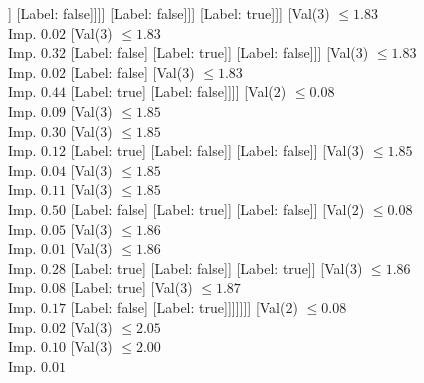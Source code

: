 \documentclass[margin=10pt]{standalone}
\begin{document}
\begin{forest}
														[Val($3$) $ \leq 1.80$ \\ Imp. $0.11$
															[Label: false]
															[Val($3$) $ \leq 1.82$ \\ Imp. $0.22$
																[Label: true]
																[Val($3$) $ \leq 1.83$ \\ Imp. $0.11$
																	[Val($3$) $ \leq 1.82$ \\ Imp. $0.50$
																		[Label: false]
																		[Label: true]]
																	[Label: false]]]]
														[Label: false]]]
												[Label: true]]]
										[Val($3$) $ \leq 1.83$ \\ Imp. $0.02$
											[Val($3$) $ \leq 1.83$ \\ Imp. $0.32$
												[Label: false]
												[Label: true]]
											[Label: false]]]
									[Val($3$) $ \leq 1.83$ \\ Imp. $0.02$
										[Label: false]
										[Val($3$) $ \leq 1.83$ \\ Imp. $0.44$
											[Label: true]
											[Label: false]]]]
								[Val($2$) $ \leq 0.08$ \\ Imp. $0.09$
									[Val($3$) $ \leq 1.85$ \\ Imp. $0.30$
										[Val($3$) $ \leq 1.85$ \\ Imp. $0.12$
											[Label: true]
											[Label: false]]
										[Label: false]]
									[Val($3$) $ \leq 1.85$ \\ Imp. $0.04$
										[Val($3$) $ \leq 1.85$ \\ Imp. $0.11$
											[Val($3$) $ \leq 1.85$ \\ Imp. $0.50$
												[Label: false]
												[Label: true]]
											[Label: false]]
										[Val($2$) $ \leq 0.08$ \\ Imp. $0.05$
											[Val($3$) $ \leq 1.86$ \\ Imp. $0.01$
												[Val($3$) $ \leq 1.86$ \\ Imp. $0.28$
													[Label: true]
													[Label: false]]
												[Label: true]]
											[Val($3$) $ \leq 1.86$ \\ Imp. $0.08$
												[Label: true]
												[Val($3$) $ \leq 1.87$ \\ Imp. $0.17$
													[Label: false]
													[Label: true]]]]]]]
							[Val($2$) $ \leq 0.08$ \\ Imp. $0.02$
								[Val($3$) $ \leq 2.05$ \\ Imp. $0.10$
									[Val($3$) $ \leq 2.00$ \\ Imp. $0.01$

\end{forest}
\end{document}
